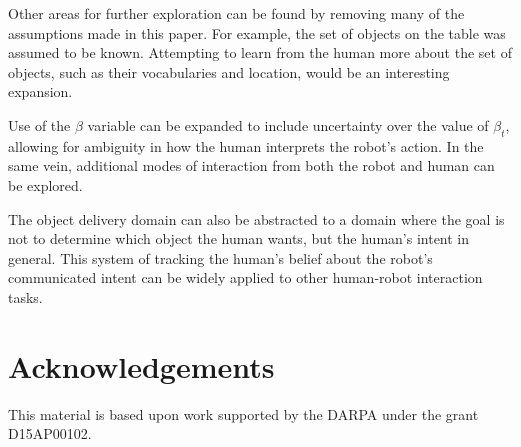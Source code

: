 \documentclass[conference]{IEEEtran}
\begin{document}
Other areas for further exploration can be found by removing many of the assumptions made in this paper. For example, the set of objects on the table was assumed to be known. Attempting to learn from the human more about the set of objects, such as their vocabularies and location, would be an interesting expansion. 

Use of the $\beta$ variable can be expanded to include uncertainty over the value of $\beta_t$, allowing for ambiguity in how the human interprets the robot's action. In the same vein, additional modes of interaction from both the robot and human can be explored. 

The object delivery domain can also be abstracted to a domain where the goal is not to determine which object the human wants, but the human's intent in general. This system of tracking the human's belief about the robot's communicated intent can be widely applied to other human-robot interaction tasks. 


\section{Acknowledgements}

This material is based upon work supported by the  DARPA under the grant D15AP00102.



\end{document}

